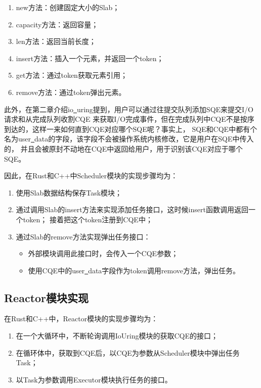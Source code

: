 \documentclass[supercite]{HustGraduPaper}
\theoremstyle{definition}
\begin{document}
\begin{enumerate}
  \item new方法：创建固定大小的Slab；
  \item capacity方法：返回容量；
  \item len方法：返回当前长度；
  \item insert方法：插入一个元素，并返回一个token；
  \item get方法：通过token获取元素引用；
  \item remove方法：通过token弹出元素。
\end{enumerate}

此外，在第二章介绍io\underline{~}uring提到，用户可以通过往提交队列添加SQE来提交I/O请求和从完成队列收割CQE
来获取I/O完成事件，但在完成队列中CQE不是按序到达的，这样一来如何直到CQE对应哪个SQE呢？事实上，
SQE和CQE中都有个名为user\underline{~}data的字段，该字段不会被操作系统内核修改，它是用户在SQE中传入的，
并且会被原封不动地在CQE中返回给用户，用于识别该CQE对应于哪个SQE。\par

因此，在Rust和C++中Scheduler模块的实现步骤均为：

\begin{enumerate}
  \item 使用Slab数据结构保存Task模块；
  \item 通过调用Slab的insert方法来实现添加任务接口，这时候insert函数调用返回一个token；
    接着把这个token注册到CQE中；
  \item 通过Slab的remove方法实现弹出任务接口：
    \begin{itemize}
      \item 外部模块调用此接口时，会传入一个CQE参数；
      \item 使用CQE中的user\underline{~}data字段作为token调用remove方法，弹出任务。
    \end{itemize}
\end{enumerate}

\subsection{Reactor模块实现}

在Rust和C++中，Reactor模块的实现步骤均为：

\begin{enumerate}
  \item 在一个大循环中，不断轮询调用IoUring模块的获取CQE的接口；
  \item 在循环体中，获取到CQE后，以CQE为参数从Scheduler模块中弹出任务Task；
  \item 以Task为参数调用Executor模块执行任务的接口。
\end{enumerate}
\end{document}
